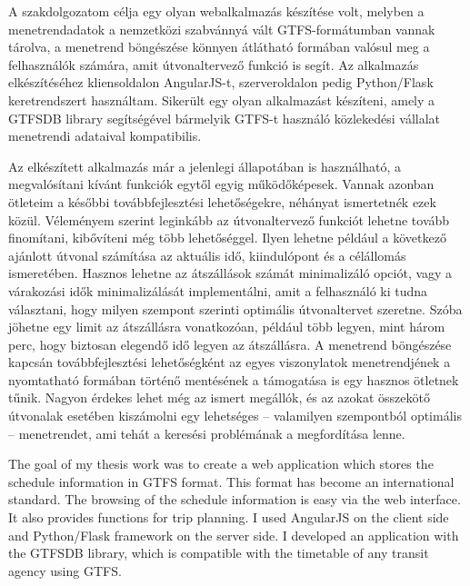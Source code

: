 

A szakdolgozatom célja egy olyan webalkalmazás készítése volt, melyben a menetrendadatok a nemzetközi szabvánnyá vált GTFS-formátumban vannak tárolva, a menetrend böngészése könnyen átlátható formában valósul meg a felhasználók számára, amit útvonaltervező funkció is segít. Az alkalmazás elkészítéséhez kliensoldalon AngularJS-t, szerveroldalon pedig Python/Flask keretrendszert használtam. Sikerült egy olyan alkalmazást készíteni, amely a GTFSDB library segítségével bármelyik GTFS-t használó közlekedési vállalat menetrendi adataival kompatibilis.

Az elkészített alkalmazás már a jelenlegi állapotában is használható, a megvalósítani kívánt funkciók egytől egyig működőképesek. Vannak azonban ötleteim a későbbi továbbfejlesztési lehetőségekre, néhányat ismertetnék ezek közül. Véleményem szerint leginkább az útvonaltervező funkciót lehetne tovább finomítani, kibővíteni még több lehetőséggel. Ilyen lehetne például a következő ajánlott útvonal számítása az aktuális idő, kiindulópont és a célállomás ismeretében. Hasznos lehetne az átszállások számát minimalizáló opciót, vagy a várakozási idők minimalizálását implementálni, amit a felhasználó ki tudna választani, hogy milyen szempont szerinti optimális útvonaltervet szeretne. Szóba jöhetne egy limit az átszállásra vonatkozóan, például több legyen, mint három perc, hogy biztosan elegendő idő legyen az átszállásra. A menetrend böngészése kapcsán továbbfejlesztési lehetőségként az egyes viszonylatok menetrendjének a nyomtatható formában történő mentésének a támogatása is egy hasznos ötletnek tűnik. Nagyon érdekes lehet még az ismert megállók, és az azokat összekötő útvonalak esetében kiszámolni egy lehetséges – valamilyen szempontból optimális – menetrendet, ami tehát a keresési problémának a megfordítása lenne.


The goal of my thesis work was to create a web application which stores the schedule information in GTFS format. This format has become an international standard. The browsing of the schedule information is easy via the web interface. It also provides functions for trip planning. I used AngularJS on the client side and Python/Flask framework on the server side. I developed an application with the GTFSDB library, which is compatible with the timetable of any transit agency using GTFS.


